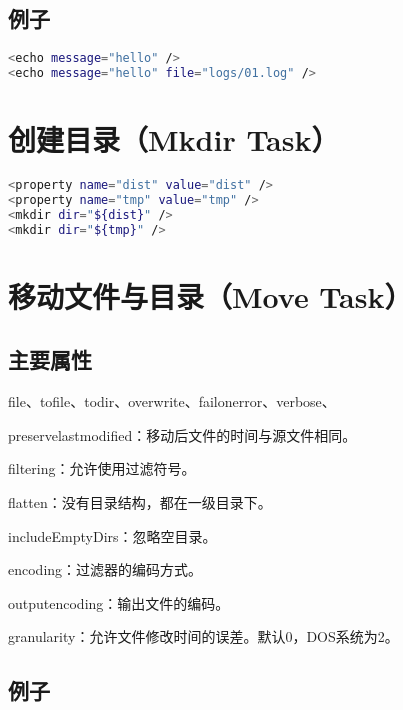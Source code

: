 \subsection{例子}

\begin{lstlisting}[language=Bash]
<echo message="hello" />
<echo message="hello" file="logs/01.log" />
\end{lstlisting}






\section{创建目录（Mkdir Task）}

\begin{lstlisting}[language=Bash]
<property name="dist" value="dist" />
<property name="tmp" value="tmp" />
<mkdir dir="${dist}" />
<mkdir dir="${tmp}" />
\end{lstlisting}






\section{移动文件与目录（Move Task）}

\subsection{主要属性}

file、tofile、todir、overwrite、failonerror、verbose、

preservelastmodified：移动后文件的时间与源文件相同。

filtering：允许使用过滤符号。

flatten：没有目录结构，都在一级目录下。

includeEmptyDirs：忽略空目录。

encoding：过滤器的编码方式。

outputencoding：输出文件的编码。

granularity：允许文件修改时间的误差。默认0，DOS系统为2。

\subsection{例子}









